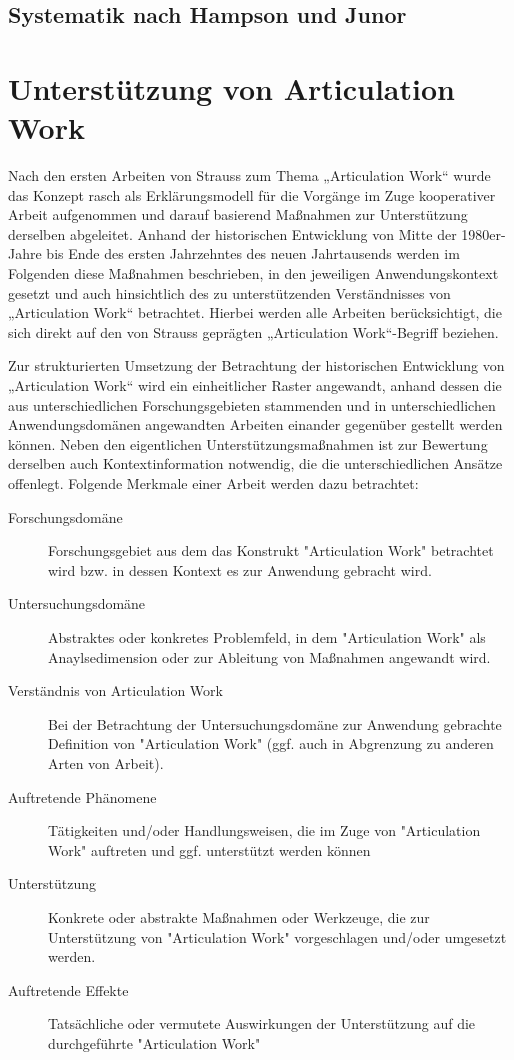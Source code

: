\subsection{Systematik nach Hampson und Junor}
\label{sub:systematik_hampson}

\section{Unterstützung von Articulation Work} %
\label{sec:unterstützung_von_articulation_work}

Nach den ersten Arbeiten von Strauss zum Thema „Articulation Work“ wurde das Konzept rasch als Erklärungsmodell für die Vorgänge im Zuge kooperativer Arbeit aufgenommen und darauf basierend Maßnahmen zur Unterstützung derselben abgeleitet. Anhand der historischen Entwicklung von Mitte der 1980er-Jahre bis Ende des ersten Jahrzehntes des neuen Jahrtausends werden im Folgenden diese Maßnahmen beschrieben, in den jeweiligen Anwendungskontext gesetzt und auch hinsichtlich des zu unterstützenden Verständnisses von „Articulation Work“ betrachtet. Hierbei werden alle Arbeiten berücksichtigt, die sich direkt auf den von Strauss geprägten „Articulation Work“-Begriff beziehen.

Zur strukturierten Umsetzung der Betrachtung der historischen Entwicklung von „Articulation Work“ wird ein einheitlicher Raster angewandt, anhand dessen die aus unterschiedlichen Forschungsgebieten stammenden und in unterschiedlichen Anwendungsdomänen angewandten Arbeiten einander gegenüber gestellt werden können. Neben den eigentlichen Unterstützungsmaßnahmen ist zur Bewertung derselben auch Kontextinformation notwendig, die die unterschiedlichen Ansätze offenlegt. Folgende Merkmale einer Arbeit werden dazu betrachtet:
\begin{description}
 \item[Forschungsdomäne] Forschungsgebiet aus dem das Konstrukt "Articulation Work" betrachtet wird bzw. in dessen Kontext es zur Anwendung gebracht wird.
 \item[Untersuchungsdomäne] Abstraktes oder konkretes Problemfeld, in dem "Articulation Work" als Anaylsedimension oder zur Ableitung von Maßnahmen angewandt wird.
 \item[Verständnis von Articulation Work] Bei der Betrachtung der Untersuchungsdomäne zur Anwendung gebrachte Definition von "Articulation Work" (ggf. auch in Abgrenzung zu anderen Arten von Arbeit).
 \item[Auftretende Phänomene] Tätigkeiten und/oder Handlungsweisen, die im Zuge von "Articulation Work" auftreten und ggf. unterstützt werden können
 \item[Unterstützung] Konkrete oder abstrakte Maßnahmen oder Werkzeuge, die zur Unterstützung von "Articulation Work" vorgeschlagen und/oder umgesetzt werden.
 \item[Auftretende Effekte] Tatsächliche oder vermutete Auswirkungen der Unterstützung auf die durchgeführte "Articulation Work"
\end{description}

